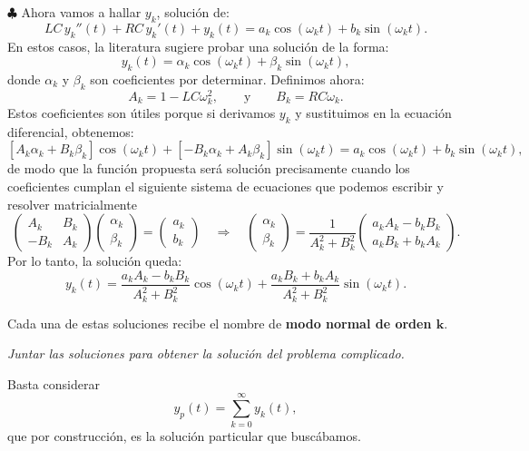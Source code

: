 \begin{enumerate}[{\bfseries [1]}]
 $\clubsuit$ Ahora vamos a hallar $y_{k}$, solución de:
\[
LC \,y_k '' (t) + RC\, y_k'(t) + y_k(t) = a_k\cos(\omega_kt) +  b_k\sin(\omega_kt) .
\]
En estos casos, la literatura sugiere probar una solución de la forma:
\[
y_{k}(t) = \alpha_k\cos(\omega_kt) + \beta_k\sin(\omega_kt),
\]
donde $\alpha_k$ y $\beta_k$ son coeficientes por determinar. Definimos ahora:
\[
A_k = 1- LC\omega_k^2,\qquad\text{y}\qquad B_k = RC\omega_k.
\]
Estos coeficientes son útiles porque si derivamos $y_{k}$ y sustituimos en la ecuación diferencial, obtenemos:
\[
 \left[A_k \alpha_k + B_k\beta_k\right] \cos(\omega_k t) + \left[-B_k \alpha_k + A_k\beta_k\right] \sin(\omega_k t) = a_k\cos(\omega_kt) +  b_k\sin(\omega_kt) ,
\]
de modo que la función propuesta será solución precisamente cuando los coeficientes cumplan el siguiente sistema de ecuaciones que podemos escribir y resolver matricialmente
\[
\left(\begin{array}{cc}
A_k  & B_k\\
-B_k & A_k
\end{array}\right)
\left(\begin{array}{c}
 \alpha_k  \\
 \beta_k
\end{array}\right)
=
\left(\begin{array}{c}
 a_k  \\
 b_k
\end{array}\right)
%
\quad \Longrightarrow \quad
%
\left(\begin{array}{c}
 \alpha_k  \\
 \beta_k
\end{array}\right)
=
\frac{1}{A_k^2+B_k^2}
\left(\begin{array}{c}
 a_kA_k-b_kB_k \\
 a_kB_k + b_kA_k
\end{array}\right).
\] 
Por lo tanto, la solución queda:
\begin{equation}
  \label{eq:ModoNormal}
  \boxed{
    y_k(t) = \frac{a_kA_k-b_kB_k}{A_k^2+B_k^2}\cos(\omega_kt) + \frac{a_kB_k + b_kA_k}{A_k^2+B_k^2}\sin(\omega_kt).
  }
\end{equation}

Cada una de estas soluciones recibe el nombre de \textbf{modo normal de orden $\mathbf{k}$}.
 
  \item \textit{\color{blue}Juntar las soluciones para obtener la solución del problema complicado.}

Basta considerar
\[\boxed{
y_p (t)= \sum _{k=0}^{\infty} y_k (t),
}\]
que por construcción, es la solución particular que buscábamos.
\end{enumerate}







